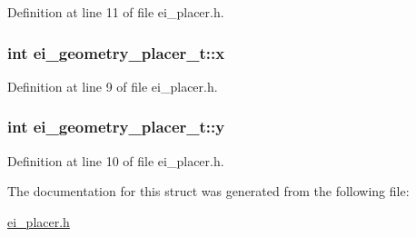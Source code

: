 Definition at line 11 of file ei\_\-placer.h.\hypertarget{structei__geometry__placer__t_a02641ff992aaeb35a51f03c7b0b41986}{
\subsubsection[{x}]{\setlength{\rightskip}{0pt plus 5cm}int {\bf ei\_\-geometry\_\-placer\_\-t::x}}}
\label{structei__geometry__placer__t_a02641ff992aaeb35a51f03c7b0b41986}


Definition at line 9 of file ei\_\-placer.h.\hypertarget{structei__geometry__placer__t_a476cd4ccb404cd5d721c5d0c660e668c}{
\subsubsection[{y}]{\setlength{\rightskip}{0pt plus 5cm}int {\bf ei\_\-geometry\_\-placer\_\-t::y}}}
\label{structei__geometry__placer__t_a476cd4ccb404cd5d721c5d0c660e668c}


Definition at line 10 of file ei\_\-placer.h.

The documentation for this struct was generated from the following file:\begin{DoxyCompactItemize}
\item 
\hyperlink{ei__placer_8h}{ei\_\-placer.h}\end{DoxyCompactItemize}
